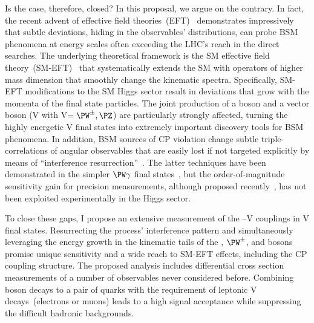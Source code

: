 \documentclass[a4paper,11pt]{article}
\newcommand{\Pb}{{{\Pqb}}\xspace}
\renewcommand{\PV}{{{{V}}}\xspace}
\newcommand{\VH}{{{\PV}{\PH}}\xspace}
\begin{document}
Is the case, therefore, closed? 
In this proposal, we argue on the contrary. In fact, the recent advent of effective field theories~(EFT)~\cite{Grinstein:1991cd,Chiu:2007dg,Passarino:2016pzb} demonstrates impressively that subtle deviations, hiding in the observables' distributions, can probe BSM phenomena at energy scales often exceeding the LHC's reach in the direct searches. 
The underlying theoretical framework is the SM effective field theory~(SM-EFT)~\cite{Jenkins:2013zja,Alonso:2013hga,Jenkins:2013wua,Englert:2014cva,Brivio:2017vri} that systematically extends the SM with operators of higher mass dimension that smoothly change the kinematic spectra.
Specifically,  SM-EFT modifications to the SM Higgs sector result in deviations that grow with the momenta of the final state particles. 
The joint production of a \PH boson and a vector boson (\VH with \PV$=\PW^{\pm},\PZ$) are particularly strongly affected, turning the highly energetic \VH final states into extremely important discovery tools for BSM phenomena. 
In addition, BSM sources of CP violation change subtle triple-correlations of angular observables that are easily lost if not targeted explicitly by means of ``interference resurrection''~\cite{Panico:2017frx}.
The latter techniques have been demonstrated in the simpler $\PW\gamma$ final states~\cite{CMS-PAS-SMP-20-005}, but the order-of-magnitude sensitivity gain for precision measurements, although proposed recently~\cite{Banerjee:2019twi}, has not been exploited experimentally in the Higgs sector. 

To close these gaps, I propose an extensive measurement of the \PH--\PV couplings in \VH final states. Resurrecting the process' interference pattern and simultaneously leveraging the energy growth in the kinematic tails of the \PH, $\PW^{\pm}$, and \PZ bosons promise unique sensitivity and a wide reach to SM-EFT effects, including the CP coupling structure.
The proposed analysis includes differential cross section measurements of a number of observables never considered before.
Combining \PH boson decays to a pair of \Pb quarks with the requirement of leptonic \PV decays~(electrons or muons) leads to a high signal acceptance while suppressing the difficult hadronic backgrounds.  
\end{document}
